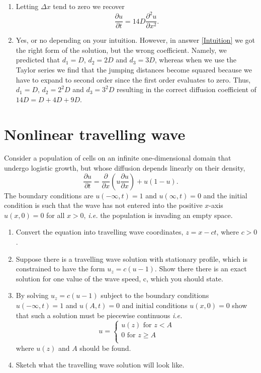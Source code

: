 \documentclass[10pt]{article}
\newcommand{\bb}{\begin{equation}}
\newcommand{\ee}{\end{equation}}
\newcommand{\D}[2]{\frac{\partial #1}{\partial #2}}
\newcommand{\DD}[2]{\frac{\partial^2 #1}{\partial #2^2}}
\newcommand{\ie}{\emph{i.e.} }
\renewcommand{\l}{\left(}
\renewcommand{\r}{\right)}
\begin{document}
\begin{Answ}
\begin{enumerate}
\item Letting $\Delta x$ tend to zero we recover
\bb
\D{u}{t}=14D\DD{u}{x}.
\ee

\item Yes, or no depending on your intuition. However, in answer \ref{Intuition} we got the right form of the solution, but the wrong coefficient. Namely, we predicted that $d_1=D$, $d_2=2D$ and $d_3=3D$, whereas when we use the Taylor series we find that the jumping distances become squared because we have to expand to second order since the first order evaluates to zero. Thus, $d_1=D$, $d_2=2^2D$ and $d_3=3^2D$ resulting in the correct diffusion coefficient of $14D=D+4D+9D$.


\end{enumerate}
\end{Answ}



\section{Nonlinear travelling wave}
Consider a population of cells on an infinite one-dimensional domain that undergo logistic growth, but whose diffusion depends linearly on their density,
\bb
\D{u}{t}=\D{}{x}\l u\D{u}{x}\r+u(1-u).
\ee
The boundary conditions are $u(-\infty,t)=1$ and $u(\infty,t)=0$ and the initial condition is such that the wave has not entered into the positive $x$-axis $u(x,0)=0$ for all $x>0$, \ie the population is invading an empty space.
\begin{enumerate}
\item Convert the equation into travelling wave coordinates, $z=x-ct$, where $c>0$.
\item Suppose there is a travelling wave solution with stationary profile, which is constrained to have the form $u_z=c(u-1)$. Show there there is an exact solution for one value of the wave speed, c, which you should state.
\item By solving $u_z=c(u-1)$ subject to the boundary conditions $u(-\infty,t)=1$ and $u(A,t)=0$ and initial conditions $u(x,0)=0$ show that such a solution must be piecewise continuous \ie
\bb
u=\left\{\begin{array}{c}
u(z) \textrm{ for } z<A\\
0 \textrm{ for } z\geq A\\
\end{array}\right.
\ee
where $u(z)$ and $A$ should be found.
\item Sketch what the travelling wave solution will look like.\label{Sketch_question}
\end{enumerate}
\end{document}
